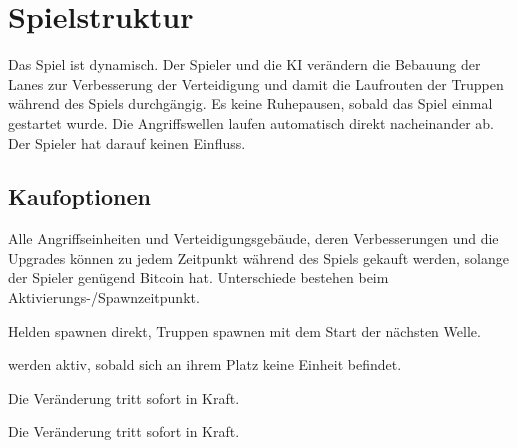\section{Spielstruktur}

%
%
%
%

Das Spiel ist dynamisch. Der Spieler und die KI verändern die Bebauung der
Lanes zur Verbesserung der Verteidigung und damit die Laufrouten der Truppen
während des Spiels durchgängig. Es keine Ruhepausen, sobald das Spiel einmal
gestartet wurde. Die Angriffswellen laufen automatisch direkt nacheinander ab.
Der Spieler hat darauf keinen Einfluss.

\subsection{Kaufoptionen}
\label{subsec:kaufoptionen}
    Alle Angriffseinheiten und Verteidigungsgebäude, deren Verbesserungen und
    die Upgrades können zu jedem Zeitpunkt während des Spiels gekauft werden, 
    solange der Spieler genügend Bitcoin hat. Unterschiede bestehen beim 
    Aktivierungs-/Spawnzeitpunkt.

  \begin{description}[noitemsep]
    \item[Angriffseinheiten] Helden spawnen direkt, Truppen spawnen mit dem
      Start der nächsten Welle.
    \item[Verteidigungsgebäude] werden aktiv, sobald sich an ihrem Platz keine
      Einheit befindet.
		\item[Verbesserungen] Die Veränderung tritt sofort in Kraft.
		\item[Upgrades] Die Veränderung tritt sofort in Kraft.
	\end{description}

